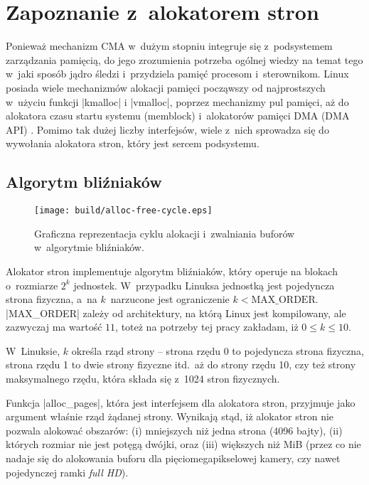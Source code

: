 \section{Zapoznanie z~alokatorem stron}

Ponieważ mechanizm CMA w~dużym stopniu integruje się z~podsystemem
zarządzania pamięcią, do jego zrozumienia potrzeba ogólnej wiedzy na
temat tego w~jaki sposób jądro śledzi i~przydziela pamięć procesom
i~sterownikom.  Linux posiada wiele mechanizmów alokacji pamięci
począwszy od najprostszych w~użyciu funkcji \code|kmalloc|
i \code|vmalloc|, poprzez mechanizmy pul pamięci, aż do alokatora
czasu startu systemu (memblock) i~alokatorów pamięci DMA (DMA API)
\autocite[rozdział 8]{bib:ldd3}.  Pomimo tak dużej liczby interfejsów,
wiele z~nich sprowadza się do wywołania alokatora stron, który jest
sercem podsystemu.

\subsection{Algorytm bliźniaków}

\begin{wrapfigure}{o}[1.5cm]{0.3\textwidth}
\begin{center}
\texttt{[image: build/alloc-free-cycle.eps]}
\end{center}
\caption[Zarządzanie pamięcią w~algorytmie bliźniaków]{Graficzna
  reprezentacja cyklu alokacji i~zwalniania buforów w~algorytmie
  bliźniaków.}
\end{wrapfigure}

Alokator stron implementuje algorytm bliźniaków, który operuje na
blokach o~rozmiarze $2^k$ jednostek.  W~przypadku Linuksa jednostką
jest pojedyncza strona fizyczna, a~na $k$~narzucone jest ograniczenie
$k < \mathrm{MAX\_ORDER}$.  \code|MAX_ORDER| zależy od architektury,
na którą Linux jest kompilowany, ale zazwyczaj ma wartość $11$, toteż
na potrzeby tej pracy zakładam, iż $0 \le k \le 10$.

W~Linuksie, $k$ określa rząd strony -- strona rzędu 0 to pojedyncza
strona fizyczna, strona rzędu 1 to dwie strony fizyczne itd.\ aż do
strony rzędu 10, czy też strony maksymalnego rzędu, która składa się
z~1024 stron fizycznych.

Funkcja \code|alloc_pages|, która jest interfejsem dla alokatora
stron, przyjmuje jako argument właśnie rząd żądanej strony.  Wynikają
stąd, iż alokator stron nie pozwala alokować obszarów: (i) mniejszych
niż jedna strona (4096 bajty), (ii) których rozmiar nie jest potęgą
dwójki, oraz (iii) większych niż \unit[4]{MiB} (przez co nie nadaje
się do alokowania buforu dla pięciomegapikselowej kamery, czy nawet
pojedynczej ramki \textit{full HD}).

